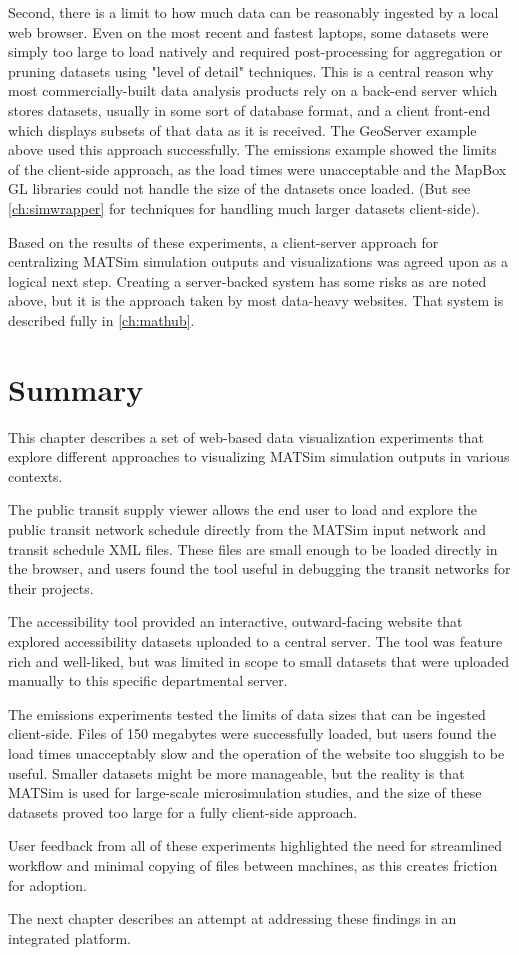 Second, there is a limit to how much data can be reasonably ingested by a local web browser. Even on the most recent and fastest laptops, some datasets were simply too large to load natively and required post-processing for aggregation or pruning datasets using "level of detail" techniques. This is a central reason why most commercially-built data analysis products rely on a back-end server which stores datasets, usually in some sort of database format, and a client front-end which displays subsets of that data as it is received. The GeoServer example above used this approach successfully. The emissions example showed the limits of the client-side approach, as the load times were unacceptable and the MapBox GL libraries could not handle the size of the datasets once loaded. (But see \autoref{ch:simwrapper} for techniques for handling much larger datasets client-side).

Based on the results of these experiments, a client-server approach for centralizing MATSim simulation outputs and visualizations was agreed upon as a logical next step. Creating a server-backed system has some risks as are noted above, but it is the approach taken by most data-heavy websites. That system is described fully in \autoref{ch:mathub}.

\hypertarget{server-experiments-summary}{%
\section{Summary}\label{server-experiments-summary}}

This chapter describes a set of web-based data visualization experiments that explore different approaches to visualizing MATSim simulation outputs in various contexts.

The public transit supply viewer allows the end user to load and explore the public transit network schedule directly from the MATSim input network and transit schedule XML files. These files are small enough to be loaded directly in the browser, and users found the tool useful in debugging the transit networks for their projects.

The accessibility tool provided an interactive, outward-facing website that explored accessibility datasets uploaded to a central server. The tool was feature rich and well-liked, but was limited in scope to small datasets that were uploaded manually to this specific departmental server.

The emissions experiments tested the limits of data sizes that can be ingested client-side. Files of 150 megabytes were successfully loaded, but users found the load times unacceptably slow and the operation of the website too sluggish to be useful. Smaller datasets might be more manageable, but the reality is that MATSim is used for large-scale microsimulation studies, and the size of these datasets proved too large for a fully client-side approach.

User feedback from all of these experiments highlighted the need for streamlined workflow and minimal copying of files between machines, as this creates friction for adoption.

The next chapter describes an attempt at addressing these findings in an integrated platform.
